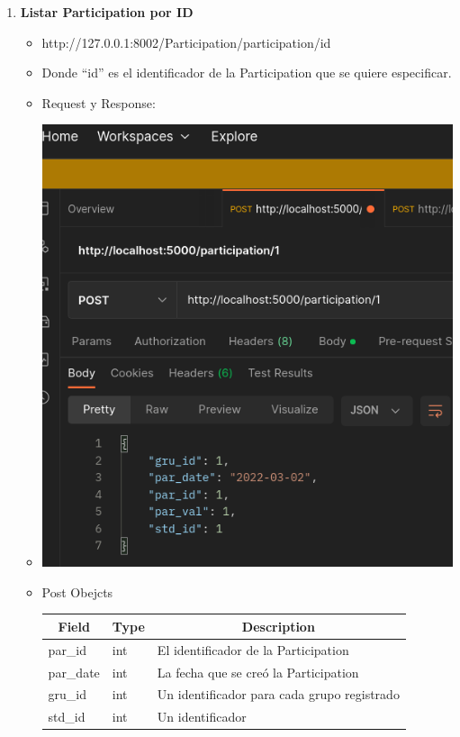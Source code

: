 \documentclass{article}
\begin{document}
\begin{enumerate}
    \item \textbf{Listar Participation por ID}
    \begin{itemize}
        \item http://127.0.0.1:8002/Participation/participation/id
        \item Donde ``id'' es el identificador de la Participation que
        se quiere especificar.
        \item Request y Response:
        \item \includegraphics[scale=.5]{assets/participation/participations1.png}
        \item Post Obejcts
        \begin{table}[H] \centering \begin{tabular}{|l|l|l|} \hline
        \multicolumn{1}{|c|}{\textbf{Field}} &
        \multicolumn{1}{c|}{\textbf{Type}} &
        \multicolumn{1}{c|}{\textbf{Description}} \\ \hline par\_id & int & El
        identificador de la Participation \\ \hline par\_date & int & La fecha
        que se creó la Participation \\ \hline gru\_id & int & Un identificador
        para cada grupo registrado \\ \hline std\_id & int & Un identificador

\end{tabular}
\end{table}
\end{itemize}
\end{enumerate}
\end{document}
